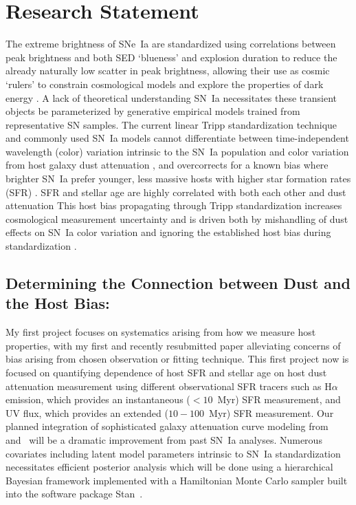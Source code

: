 \documentclass[modern]{aastex63}
\begin{document}
\section{Research Statement}
The extreme brightness of SNe~Ia are standardized using correlations between peak brightness and both SED `blueness' and explosion duration to reduce the already naturally low scatter in peak brightness, allowing their use as cosmic `rulers' to constrain cosmological models and explore the properties of dark energy \citep{Perlmutter1999}.
A lack of theoretical understanding SN~Ia necessitates these transient objects be parameterized by generative empirical models trained from representative SN samples.
The current linear Tripp standardization technique and commonly used SN~Ia models cannot differentiate between time-independent wavelength (color) variation intrinsic to the SN~Ia population and color variation from host galaxy dust attenuation \citep{Mandel2017}, and overcorrects for a known bias where brighter SN~Ia prefer younger, less massive hosts with higher star formation rates (SFR) \citep{Sullivan2010,Rigault2018}.
SFR and stellar age are highly correlated with both each other and dust attenuation
This host bias propagating through Tripp standardization increases cosmological measurement uncertainty and is driven both by mishandling of dust effects on SN~Ia color variation and ignoring the established host bias during standardization \citep{Brout2021,Rose2021}.

\subsection{Determining the Connection between Dust and the Host Bias:}
My first project focuses on systematics arising from how we measure host properties, with my first and recently resubmitted paper alleviating concerns of bias arising from chosen observation or fitting technique.  This first project now is focused on quantifying dependence of host SFR and stellar age on host dust attenuation measurement using different observational SFR tracers such as H$\alpha$ emission, which provides an instantaneous ($<10$~Myr) SFR measurement, and UV flux, which provides an extended ($10-100$~Myr) SFR measurement. 
Our planned integration of sophisticated galaxy attenuation curve modeling from~\cite{Salim2018} and~\cite{Narayanan2018} will be a dramatic improvement from past SN~Ia analyses.
Numerous covariates including latent model parameters intrinsic to SN~Ia standardization necessitates efficient posterior analysis which will be done using a hierarchical Bayesian framework implemented with a Hamiltonian Monte Carlo sampler built into the software package Stan~\cite{STAN}.
\end{document}
